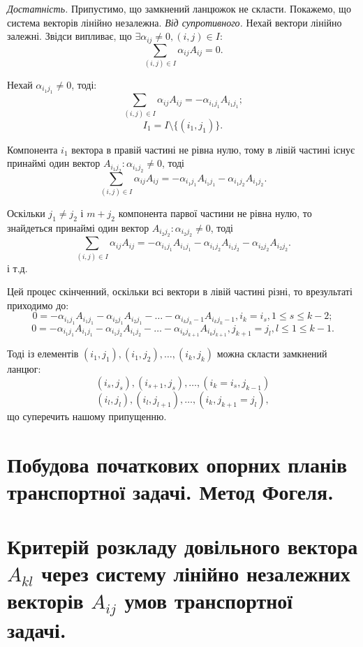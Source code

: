\documentclass[12pt,a4paper]{article}
\begin{document}
{\it Достатність.} Припустимо, що замкнений ланцюжок не скласти. Покажемо, що система векторів лінійно незалежна. {\it Від супротивного.} Нехай вектори лінійно залежні. Звідси випливає, що $\exists \alpha_{ij} \neq 0, (i,j) \in I:$ $$\sum_{(i,j) \in I}\alpha_{ij}A_{ij} = 0.$$

Нехай $\alpha_{{i_1}{j_1}} \neq 0$, тоді: 
$$\sum_{(i,j) \in I}\alpha_{ij}A_{ij} = -\alpha_{{i_1}{j_1}}A_{{i_1}{j_1}};$$
$$I_1 = I\setminus\{(i_1,j_1)\}.$$

Компонента $i_1$ вектора в правій частині не рівна нулю, тому в лівій частині існує принаймі один вектор $A_{{i_1}{j_2}}: \alpha_{{i_1}{j_2}}\neq0$, тоді 
$$\sum_{(i,j){\in}I}\alpha_{ij}A_{ij} = -\alpha_{{i_1}{j_1}}A_{{i_1}{j_1}}-\alpha_{{i_1}{j_2}}A_{{i_1}{j_2}}.$$

Оскільки $j_1 \neq j_2$ і $m + j_2$ компонента парвої частини не рівна нулю, то знайдеться принаймі один вектор $A_{{i_2}{j_2}}: \alpha_{{i_2}{j_2}} \neq 0$, тоді $$\sum_{(i,j) \in I}\alpha_{ij}A_{ij} = -\alpha_{{i_1}{j_1}}A_{{i_1}{j_1}}-\alpha_{{i_1}{j_2}}A_{{i_1}{j_2}}-\alpha_{{i_2}{j_2}}A_{{i_2}{j_2}}.$$
і т.д.

Цей процес скінченний, оскільки всі вектори в лівій частині різні, то врезультаті приходимо до:
$$0 = -\alpha_{{i_1}{j_1}}A_{{i_1}{j_1}}-\alpha_{{i_2}{j_1}}A_{{i_2}{j_1}}-\dots-\alpha_{{i_k}{j_k-1}}A_{{i_k}{j_k-1}}, i_k=i_s, 1 \leq s \leq k-2;$$
$$0 = -\alpha_{{i_1}{j_1}}A_{{i_1}{j_1}}-\alpha_{{i_1}{j_2}}A_{{i_1}{j_2}}-\dots-\alpha_{{i_k}{j_{k+1}}}A_{{i_k}{j_{k+1}}}, j_{k+1}=j_l, l \leq 1 \leq k-1.$$

Тоді із елементів $(i_1,j_1), (i_1,j_2), \dots, (i_k,j_k)$ можна скласти замкнений ланцюг:
$$(i_s,j_s), (i_{s+1},j_s), \dots, (i_k = i_s, j_{k-1})$$
$$(i_l,j_l), (i_l,j_{l+1}), \dots, (i_k, j_{k+1} = j_l),$$
що суперечить нашому припущенню.

\clearpage

\section{Побудова початкових опорних планів транспортної задачі. Метод Фогеля.}

\clearpage

\section{Критерій розкладу довільного вектора $A_{kl}$ через систему лінійно незалежних векторів $A_{ij}$ умов транспортної задачі.}
\end{document}
